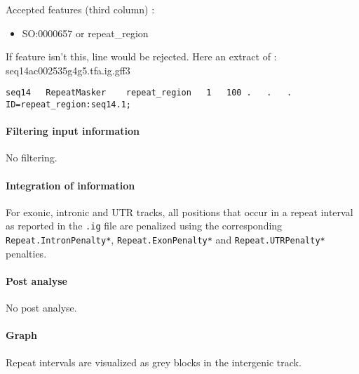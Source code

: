 Accepted features (third column) :
\begin{itemize}
\item  SO:0000657 or repeat\_region
\end{itemize}
If feature isn't this, line would be rejected.
Here an extract of : seq14ac002535g4g5.tfa.ig.gff3
\begin{Verbatim}[fontsize=\tiny]
seq14	RepeatMasker	repeat_region	1	100	.	.	.	ID=repeat_region:seq14.1;
\end{Verbatim}

\paragraph{Filtering input information}

No filtering.

\paragraph{Integration of information}

For exonic, intronic and UTR tracks, all positions that occur in a
repeat interval as reported in the \texttt{.ig} file are penalized
using the corresponding \texttt{Repeat.IntronPenalty*},
\texttt{Repeat.ExonPenalty*} and \texttt{Repeat.UTRPenalty*} penalties.

\paragraph{Post analyse}

No post analyse.

\paragraph{Graph}

Repeat intervals are visualized as grey blocks in the intergenic
track.




